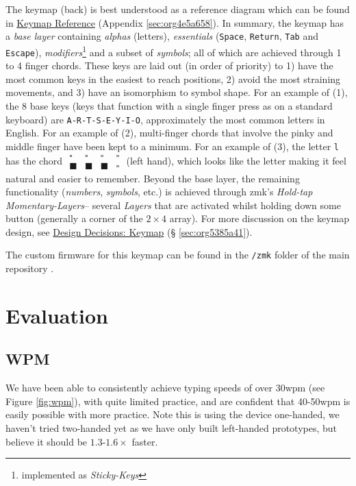 \documentclass[logo,bsc,singlespacing,parskip]{infthesis}
\begin{document}
The keymap (back) is best understood as a reference diagram which can be found in
\hyperref[sec:org4e5a658]{Keymap Reference} (Appendix \ref{sec:org4e5a658}).
In summary, the keymap has a \emph{base layer} containing \emph{alphas} (letters), \emph{essentials} (\texttt{Space}, \texttt{Return}, \texttt{Tab} and \texttt{Escape}), \emph{modifiers}\footnote{implemented as \emph{Sticky-Keys}} and a subset of \emph{symbols}; all of which are achieved through 1 to 4 finger chords.
These keys are laid out (in order of priority) to 1) have the most common keys in the easiest to reach positions, 2) avoid the most straining movements, and 3) have an isomorphism to symbol shape.
For an example of (1), the 8 base keys (keys that function with a single finger press as on a standard keyboard) are  \texttt{A-R-T-S-E-Y-I-O}, approximately the most common letters in English.
For an example of (2), multi-finger chords that involve the pinky and middle finger have been kept to a minimum.
For an example of (3), the letter \texttt{l} has the chord \(\begin{matrix} \square & \square  & \square  & \square \\ \blacksquare &  \blacksquare & \blacksquare & \square \end{matrix}\) (left hand), which looks like the letter making it feel natural and easier to remember.
Beyond the base layer, the remaining functionality (\emph{numbers}, \emph{symbols}, etc.) is achieved through zmk's \autocite{ZMKFirmware}  \emph{Hold-tap} \emph{Momentary-Layers}-- several \emph{Layers} that are activated whilst holding down some button (generally a corner of the \(2\times4\) array).
For more discussion on the keymap design, see \hyperref[sec:org5385a41]{Design Decisions: Keymap} (§ \ref{sec:org5385a41}).

The custom firmware for this keymap can be found in the \texttt{/zmk} folder of the main repository \autocite{sharpNazzacodeHCIDMy}.
\section{Evaluation}
\label{sec:org11c05f5}
\subsection{WPM}
\label{sec:org61723c3}
We have been able to consistently achieve typing speeds of over 30wpm (see Figure \ref{fig:wpm}), with quite limited practice, and are confident that 40-50wpm is easily possible with more practice.
Note this is using the device one-handed, we haven't tried two-handed yet as we have only built left-handed prototypes, but believe it should be \(1.3\)-\(1.6\times\) faster.
\end{document}
